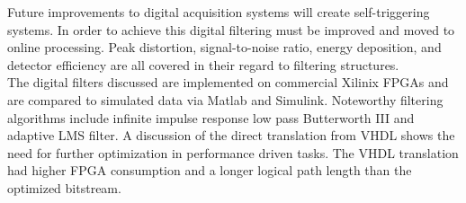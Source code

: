 \documentclass[12pt]{article}
\begin{document}
\begin{doublespacing}
\citep{Alberto200999}
Future improvements to digital acquisition systems will create self-triggering systems.
In order to achieve this digital filtering must be improved and moved to online processing.
Peak distortion, signal-to-noise ratio, energy deposition, and detector efficiency are all covered in their regard to filtering structures.
\\

The digital filters discussed are implemented on commercial Xilinix FPGAs and are compared to simulated data via Matlab and Simulink.
Noteworthy filtering algorithms include infinite impulse response low pass Butterworth III and adaptive LMS filter.
A discussion of the direct translation from VHDL shows the need for further optimization in performance driven tasks.
The VHDL translation had higher FPGA consumption and a longer logical path length than the optimized bitstream.



\pagebreak
\end{doublespacing}


\end{document}
